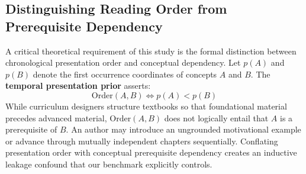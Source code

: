 \subsection{Distinguishing Reading Order from Prerequisite Dependency}
A critical theoretical requirement of this study is the formal distinction between chronological presentation order and conceptual dependency. Let $p(A)$ and $p(B)$ denote the first occurrence coordinates of concepts $A$ and $B$. The \textbf{temporal presentation prior} asserts:
\begin{equation}
\text{Order}(A, B) \iff p(A) < p(B)
\end{equation}
While curriculum designers structure textbooks so that foundational material precedes advanced material, $\text{Order}(A, B)$ does not logically entail that $A$ is a prerequisite of $B$. An author may introduce an ungrounded motivational example or advance through mutually independent chapters sequentially. Conflating presentation order with conceptual prerequisite dependency creates an inductive leakage confound that our benchmark explicitly controls.
